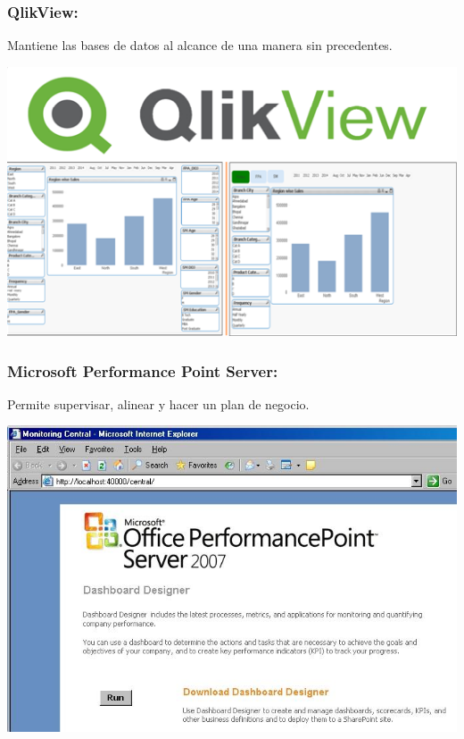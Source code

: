 \subsubsection{QlikView: }\label{sec:nada2}  
Mantiene las bases de datos al alcance de una manera sin precedentes.
	\begin{center}
	\includegraphics[width=15cm]{./Imagenes/BIimagen6}
	\end{center}
	
\subsubsection{Microsoft Performance Point Server: }\label{sec:nada2}  
Permite supervisar, alinear y hacer un plan de negocio.
	\begin{center}
	\includegraphics[width=15cm]{./Imagenes/BIimagen7}
	\end{center}
	
